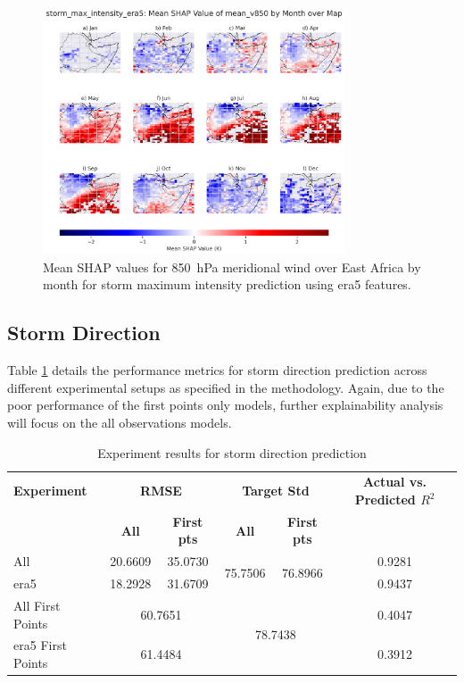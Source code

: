 \begin{figure}[ht]
    \centering
    \includegraphics[width=0.8\textwidth]{../figures/generated/experiments/storm_max_intensity/geographic_corr/storm_max_intensity_era5_shap_mean_v850_map_by_month.png}
    \caption{Mean SHAP values for \SI{850}{\hecto\pascal} meridional wind over East Africa by month for storm maximum intensity prediction using \acrshort{era5} features.}
    \label{fig:storm_max_intensity_era5_shap_mean_v850_map_by_month}
\end{figure}

\clearpage
\subsection{Storm Direction}

Table \ref{tab:storm_direction_results} details the performance metrics for storm direction prediction across different experimental setups as specified in the methodology. Again, due to the poor performance of the first points only models, further explainability analysis will focus on the all observations models.

\begin{table}[ht]
\centering
\caption{Experiment results for storm direction prediction}
\label{tab:storm_direction_results}
\begin{tabular}{lccccc}
\hline
\textbf{Experiment} & \multicolumn{2}{c}{\textbf{RMSE}} & \multicolumn{2}{c}{\textbf{Target Std}} & \textbf{Actual vs. Predicted $R^2$} \\
\cline{2-5}
 & \textbf{All} & \textbf{First pts} & \textbf{All} & \textbf{First pts} &  \\
\hline
All              & 20.6609 & 35.0730 & \multirow{2}{*}{75.7506} & \multirow{2}{*}{76.8966} & 0.9281 \\
\acrshort{era5}             & 18.2928 & 31.6709 & & & 0.9437 \\
All First Points & \multicolumn{2}{c}{60.7651} & \multicolumn{2}{c}{\multirow{2}{*}{78.7438}} & 0.4047 \\
\acrshort{era5} First Points & \multicolumn{2}{c}{61.4484} & & & 0.3912 \\
\hline
\end{tabular}
\end{table}

